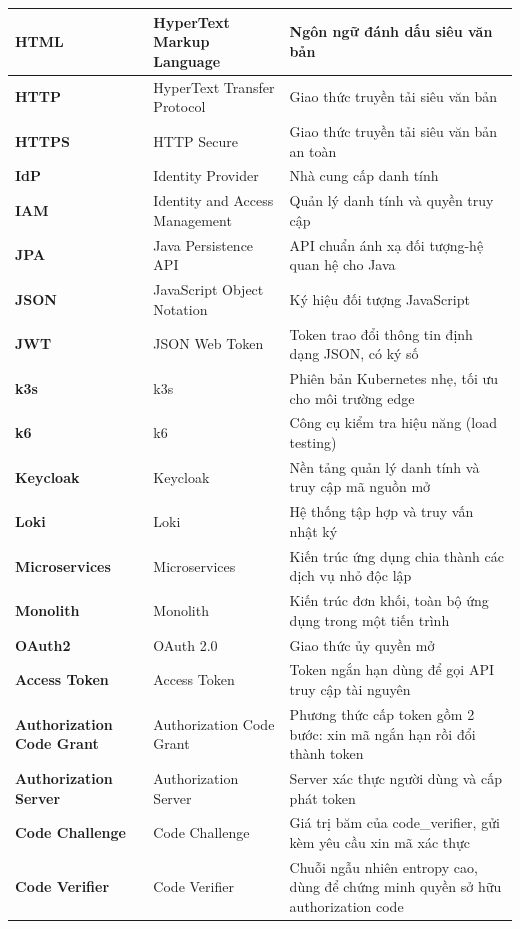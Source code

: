 \documentclass[../BTL.tex]{subfiles}
\begin{document}
\begin{longtable}{|p{3.2cm}|p{3.5cm}|p{7.1cm}|}
	\textbf{HTML} & HyperText Markup Language & Ngôn ngữ đánh dấu siêu văn bản\\ \hline
	\textbf{HTTP} & HyperText Transfer Protocol & Giao thức truyền tải siêu văn bản\\ \hline
	\textbf{HTTPS} & HTTP Secure & Giao thức truyền tải siêu văn bản an toàn\\ \hline
	\textbf{IdP} & Identity Provider & Nhà cung cấp danh tính\\ \hline
	\textbf{IAM} & Identity and Access Management & Quản lý danh tính và quyền truy cập\\ \hline
	\textbf{JPA} & Java Persistence API & API chuẩn ánh xạ đối tượng-hệ quan hệ cho Java\\ \hline
	\textbf{JSON} & JavaScript Object Notation & Ký hiệu đối tượng JavaScript\\ \hline
	\textbf{JWT} & JSON Web Token & Token trao đổi thông tin định dạng JSON, có ký số\\ \hline
	\textbf{k3s} & k3s & Phiên bản Kubernetes nhẹ, tối ưu cho môi trường edge\\ \hline
	\textbf{k6} & k6 & Công cụ kiểm tra hiệu năng (load testing)\\ \hline
	\textbf{Keycloak} & Keycloak & Nền tảng quản lý danh tính và truy cập mã nguồn mở\\ \hline
	\textbf{Loki} & Loki & Hệ thống tập hợp và truy vấn nhật ký\\ \hline
	\textbf{Micro\-services} & Micro\-services & Kiến trúc ứng dụng chia thành các dịch vụ nhỏ độc lập\\ \hline
	\textbf{Monolith} & Monolith & Kiến trúc đơn khối, toàn bộ ứng dụng trong một tiến trình\\ \hline
  \textbf{OAuth2} & OAuth 2.0 & Giao thức ủy quyền mở\\ \hline
  \textbf{Access Token} & Access Token & Token ngắn hạn dùng để gọi API truy cập tài nguyên\\ \hline
  \textbf{Authorization Code Grant} & Authorization Code Grant & Phương thức cấp token gồm 2 bước: xin mã ngắn hạn rồi đổi thành token\\ \hline
  \textbf{Authorization Server} & Authorization Server & Server xác thực người dùng và cấp phát token\\ \hline
  \textbf{Code Challenge} & Code Challenge & Giá trị băm của code\_verifier, gửi kèm yêu cầu xin mã xác thực\\ \hline
  \textbf{Code Verifier} & Code Verifier & Chuỗi ngẫu nhiên entropy cao, dùng để chứng minh quyền sở hữu authorization code\\ \hline

\end{longtable}
\end{document}
